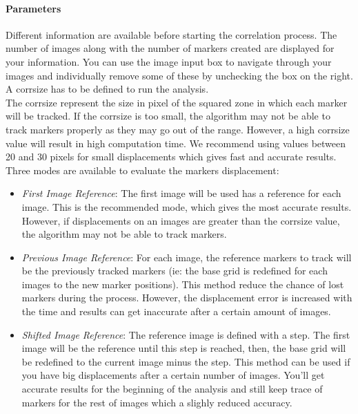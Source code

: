 \paragraph{Parameters\\\newline}
\label{par:Parameters}
\newline
\indent\indent Different information are available before starting the correlation process. The number of images along with the number of markers created are displayed for your information. You can use the image input box to navigate through your images and individually remove some of these by unchecking the box on the right. A corrsize has to be defined to run the analysis.\\
\newline
\indent The corrsize represent the size in pixel of the squared zone in which each marker will be tracked. If the corrsize is too small, the algorithm may not be able to track markers properly as they may go out of the range. However, a high corrsize value will result in high computation time. We recommend using values between 20 and 30 pixels for small displacements which gives fast and accurate results.\\
\newline
Three modes are available to evaluate the markers displacement:
\begin{itemize}
  \item \textit{First Image Reference}: The first image will be used has a reference for each image. This is the recommended mode, which gives the most accurate results. However, if displacements on an images are greater than the corrsize value, the algorithm may not be able to track markers.
  \item \textit{Previous Image Reference}: For each image, the reference markers to track will be the previously tracked markers (ie: the base grid is redefined for each images to the new marker positions). This method reduce the chance of lost markers during the process. However, the displacement error is increased with the time and results can get inaccurate after a certain amount of images.
  \item \textit{Shifted Image Reference}:  The reference image is defined with a step. The first image will be the reference until this step is reached, then, the base grid will be redefined to the current image minus the step. This method can be used if you have big displacements after a certain number of images. You'll get accurate results for the beginning of the analysis and still keep trace of markers for the rest of images which a slighly reduced accuracy.
\end{itemize}
